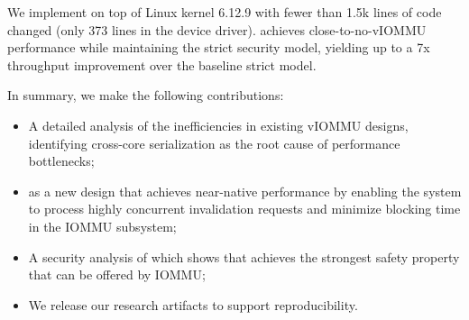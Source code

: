 
We implement \brand on top of Linux kernel 6.12.9
with fewer than 1.5k lines of code changed (only 373 lines in the device driver).
\brand achieves close-to-no-vIOMMU performance
while maintaining the strict security model,
yielding up to a 7x throughput improvement over the baseline strict model.

In summary, we make the following contributions:
\begin{itemize}[leftmargin=*]
    \item A detailed analysis of the inefficiencies in existing vIOMMU designs,
    identifying cross-core serialization as the root cause of performance bottlenecks;
    \item \brand as a new design that achieves near-native performance
        by enabling the system to process highly concurrent invalidation requests and minimize blocking time in the IOMMU subsystem;
    \item  A security analysis of \brand which shows that \brand achieves the strongest 
        safety property that can be offered by IOMMU;   
    \item We release our research artifacts to support reproducibility.
\end{itemize}

